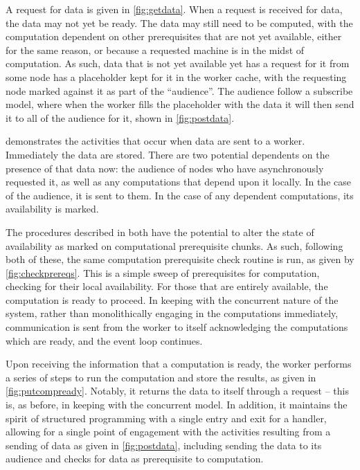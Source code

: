 
A request for data is given in \cref{fig:getdata}.
When a request is received for data, the data may not yet be ready.
The data may still need to be computed, with the computation dependent on other prerequisites that are not yet available, either for the same reason, or because a requested machine is in the midst of computation.
As such, data that is not yet available yet has a request for it from some node has a placeholder kept for it in the worker cache, with the requesting node marked against it as part of the ``audience''.
The audience follow a subscribe model, where when the worker fills the placeholder with the data it will then send it to all of the audience for it, shown in \cref{fig:postdata}.


 demonstrates the activities that occur when data are sent to a worker.
Immediately the data are stored.
There are two potential dependents on the presence of that data now: the audience of nodes who have asynchronously requested it, as well as any computations that depend upon it locally.
In the case of the audience, it is sent to them.
In the case of any dependent computations, its availability is marked.


The procedures described in  both have the potential to alter the state of availability as marked on computational prerequisite chunks.
As such, following both of these, the same computation prerequisite check routine is run, as given by \cref{fig:checkprereqs}.
This is a simple sweep of prerequisites for computation, checking for their local availability.
For those that are entirely available, the computation is ready to proceed.
In keeping with the concurrent nature of the system, rather than monolithically engaging in the computations immediately, communication is sent from the worker to itself acknowledging the computations which are ready, and the event loop continues.


Upon receiving the information that a computation is ready, the worker performs a series of steps to run the computation and store the results, as given in \cref{fig:putcompready}.
Notably, it returns the data to itself through a request -- this is, as before, in keeping with the concurrent model.
In addition, it maintains the spirit of structured programming with a single entry and exit for a handler, allowing for a single point of engagement with the activities resulting from a sending of data as given in \cref{fig:postdata}, including sending the data to its audience and checks for data as prerequisite to computation.

